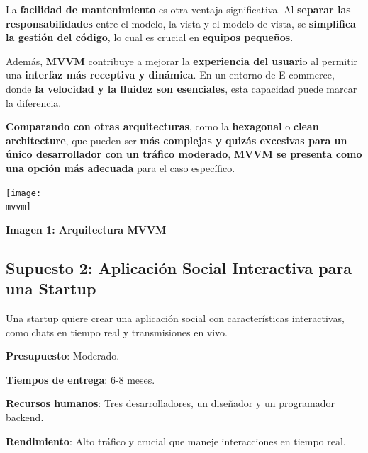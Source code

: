 \documentclass[a4paper]{article}
\newcommand{\mvvm}{imagenes/mvvm.png}
\begin{document}
    La \textbf{facilidad de mantenimiento} es otra ventaja significativa. Al \textbf{separar las responsabilidades} entre el modelo, la vista y el modelo de vista, se \textbf{simplifica la gestión del código}, lo cual es crucial en \textbf{equipos pequeños}.\vspace{0.3cm}
    
    Además, \textbf{MVVM} contribuye a mejorar la \textbf{experiencia del usuari}o al permitir una \textbf{interfaz más receptiva y dinámica}. En un entorno de E-commerce, donde \textbf{la velocidad y la fluidez son esenciales}, esta capacidad puede marcar la diferencia.\vspace{0.3cm}
    
    \textbf{Comparando con otras arquitecturas}, como la \textbf{hexagonal} o \textbf{clean architecture}, que pueden ser \textbf{más complejas y quizás excesivas para un único desarrollador con un tráfico moderado}, \textbf{MVVM se presenta como una opción más adecuada} para el caso específico.

    \begin{center}
        \texttt{[image: \\mvvm]}\vspace{0.2cm}\par
        \textbf{Imagen 1: Arquitectura MVVM}
    \end{center}

    \subsection{Supuesto 2: Aplicación Social Interactiva para una Startup}

    Una startup quiere crear una aplicación social con características interactivas, como chats en tiempo real y transmisiones en vivo.\vspace{0.2cm}

    \textbf{Presupuesto}: Moderado.\vspace{0.3cm}

    \textbf{Tiempos de entrega}: 6-8 meses.\vspace{0.2cm}
    
    \textbf{Recursos humanos}: Tres desarrolladores, un diseñador y un programador backend.\vspace{0.2cm}
    
    \textbf{Rendimiento}: Alto tráfico y crucial que maneje interacciones en tiempo real.\vspace{0.2cm}
    
\end{document}
